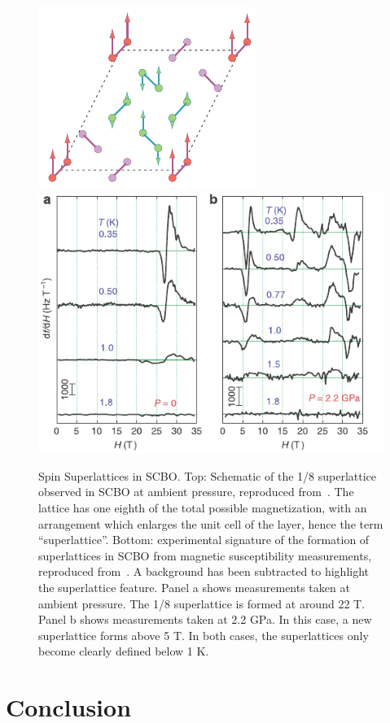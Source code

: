 \documentclass{thesis-umich}
\begin{document}
\begin{figure}
	\centering
	\caption[Spin Superlattices in SCBO]{Spin Superlattices in SCBO. Top: Schematic of the 1/8 superlattice observed in SCBO at ambient pressure, reproduced from~\cite{Rice2002}. The lattice has one eighth of the total possible magnetization, with an arrangement which enlarges the unit cell of the layer, hence the term ``superlattice''. Bottom: experimental signature of the formation of superlattices in SCBO from magnetic susceptibility measurements, reproduced from~\cite{Haravifard2016}. A background has been subtracted to highlight the superlattice feature. Panel a shows measurements taken at ambient pressure. The 1/8 superlattice is formed at around 22 T. Panel b shows measurements taken at 2.2 GPa. In this case, a new superlattice forms above 5 T. In both cases, the superlattices only become clearly defined below 1 K.}
	\label{fig:SCBO_superlattice}
	\centering
	\includegraphics[width=0.5\columnwidth]{figures/SCBO_superlattice.pdf}
	\includegraphics[width=0.9\columnwidth]{figures/SCBO_plateaus.pdf}
\end{figure}

\chapter{Conclusion}
\end{document}
